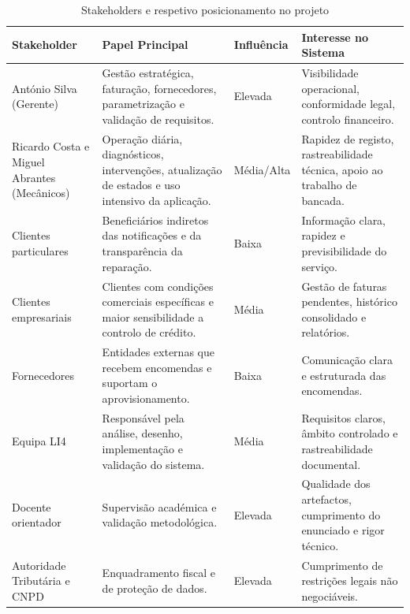 \documentclass[a4paper,12pt]{scrreprt}
\begin{document}
        \begin{table}[H]
            \centering
            \small
            \begin{tabular}{|p{3.2cm}|p{5.5cm}|p{2.4cm}|p{4.3cm}|}
                \hline
                \rowcolor{gray!20!white}
                \textbf{Stakeholder} & \textbf{Papel Principal} & \textbf{Influência} & \textbf{Interesse no Sistema} \\
                \hline
                António Silva (Gerente) & Gestão estratégica, faturação, fornecedores, parametrização e validação de requisitos. & Elevada & Visibilidade operacional, conformidade legal, controlo financeiro. \\
                \hline
                Ricardo Costa e Miguel Abrantes (Mecânicos) & Operação diária, diagnósticos, intervenções, atualização de estados e uso intensivo da aplicação. & Média/Alta & Rapidez de registo, rastreabilidade técnica, apoio ao trabalho de bancada. \\
                \hline
                Clientes particulares & Beneficiários indiretos das notificações e da transparência da reparação. & Baixa & Informação clara, rapidez e previsibilidade do serviço. \\
                \hline
                Clientes empresariais & Clientes com condições comerciais específicas e maior sensibilidade a controlo de crédito. & Média & Gestão de faturas pendentes, histórico consolidado e relatórios. \\
                \hline
                Fornecedores & Entidades externas que recebem encomendas e suportam o aprovisionamento. & Baixa & Comunicação clara e estruturada das encomendas. \\
                \hline
                Equipa LI4 & Responsável pela análise, desenho, implementação e validação do sistema. & Média & Requisitos claros, âmbito controlado e rastreabilidade documental. \\
                \hline
                Docente orientador & Supervisão académica e validação metodológica. & Elevada & Qualidade dos artefactos, cumprimento do enunciado e rigor técnico. \\
                \hline
                Autoridade Tributária e CNPD & Enquadramento fiscal e de proteção de dados. & Elevada & Cumprimento de restrições legais não negociáveis. \\
                \hline
            \end{tabular}
            \caption{Stakeholders e respetivo posicionamento no projeto}
        \end{table}
\end{document}
